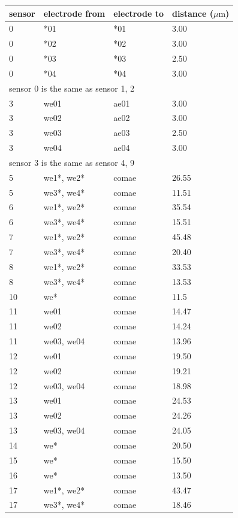 \begin{table}
	\begin{tabular}{llll}
		sensor & electrode from & electrode to & distance ($\mu \mathrm{m}$) \\
		\hline
		0 & *01 & *01 & 3.00 \\
		0 & *02 & *02 & 3.00 \\
		0 & *03 & *03 & 2.50 \\
		0 & *04 & *04 & 3.00 \\
		\multicolumn{4}{l}{sensor 0 is the same as sensor 1, 2} \\
		3 & we01 & ae01 & 3.00 \\
		3 & we02 & ae02 & 3.00 \\
		3 & we03 & ae03 & 2.50 \\
		3 & we04 & ae04 & 3.00 \\
		\multicolumn{4}{l}{sensor 3 is the same as sensor 4, 9} \\
		5 & we1*, we2* & comae & 26.55 \\
		5 & we3*, we4* & comae & 11.51 \\
		6 & we1*, we2* & comae & 35.54 \\
		6 & we3*, we4* & comae & 15.51 \\
		7 & we1*, we2* & comae & 45.48 \\
		7 & we3*, we4* & comae & 20.40 \\
		8 & we1*, we2* & comae & 33.53 \\
		8 & we3*, we4* & comae & 13.53 \\
		10 & we* & comae & 11.5 \\
		11 & we01 & comae & 14.47 \\
		11 & we02 & comae & 14.24 \\
		11 & we03, we04 & comae & 13.96 \\
		12 & we01 & comae & 19.50 \\
		12 & we02 & comae & 19.21 \\
		12 & we03, we04 & comae & 18.98 \\
		13 & we01 & comae & 24.53 \\
		13 & we02 & comae & 24.26 \\
		13 & we03, we04 & comae & 24.05 \\
		14 & we* & comae & 20.50 \\
		15 & we* & comae & 15.50 \\
		16 & we* & comae & 13.50 \\
		17 & we1*, we2* & comae & 43.47 \\
		17 & we3*, we4* & comae & 18.46 \\

\end{tabular}
\end{table}
